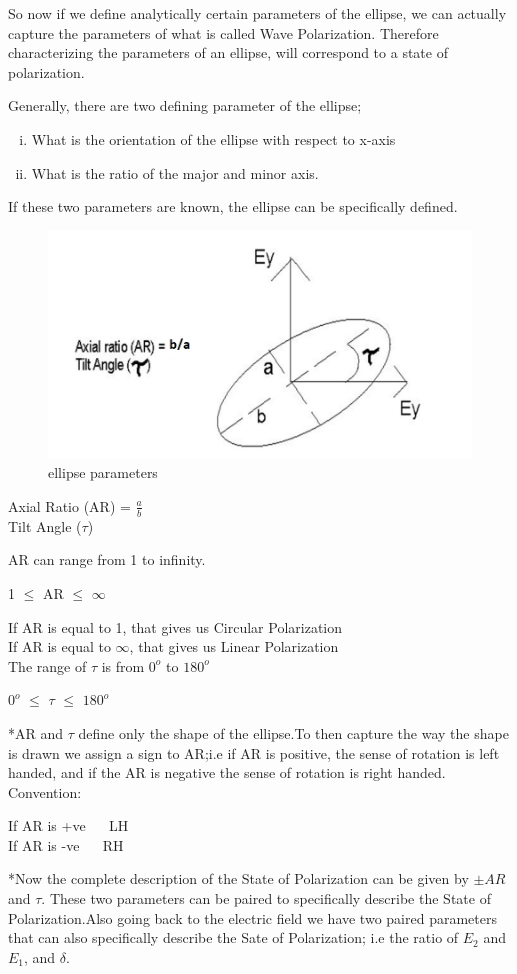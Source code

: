 So now if we define analytically certain parameters of the ellipse, we can actually capture the parameters of what is called Wave Polarization. Therefore characterizing the parameters of an ellipse, will correspond to a state of polarization.

Generally, there are two defining parameter of the ellipse;
\begin{enumerate}[(i)]
\item What is the orientation of the ellipse with respect to x-axis 
\item What is the ratio of the major and minor axis.
\end{enumerate}
If these two parameters are known, the ellipse can be specifically defined.
\begin{figure}[h]
\centering
\includegraphics[width=1\linewidth]{./graphics/back}
\caption{ellipse parameters}
\end{figure}

\begin{center}
Axial Ratio (AR) = $\frac{a}{b}$\\
Tilt Angle ($\tau$)
\end{center}
AR can range from 1 to infinity.\begin{center}
1 $\leq $ AR $\leq $ $\infty $
\end{center}
If AR is equal to 1, that gives us Circular Polarization\\
If AR is equal to $\infty$, that gives us Linear Polarization\\
The range of $\tau $ is from $0^{o}$ to $180^{o}$ 
\begin{center}
$0^{o}$ $\leq $ $\tau $ $\leq $ $180^{o} $
\end{center}
*AR and $\tau $ define only the shape of the ellipse.To then capture the way the shape is drawn we assign a sign to AR;i.e if AR is positive, the sense of rotation is left handed, and if the AR is negative the sense of rotation is right handed.\\
Convention:
\begin{center}
If AR is +ve $\quad$ LH\\
If AR is -ve $\quad$ RH
\end{center}
*Now the complete description of the State of Polarization can be given by $\pm AR$ and $\tau $. These two parameters can be paired to specifically describe the State of Polarization.Also going back to the electric field we have two paired parameters that can also specifically describe the Sate of Polarization; i.e the ratio of $ E_2 $ and $ E_1 $, and $\delta$.

